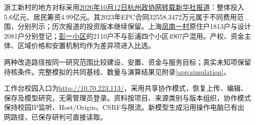 \documentclass[UTF8,11pt,fontset=windows]{ctexart}
\begin{document}
浙工新村的地方对标采用\href{https://www.hzzx.gov.cn/cshz/content/2026-10/12/content_9334536.htm}{2026年10月12日杭州政协网转载新华社报道}：整体投入5.6亿元、居民筹资4.99亿元。其2023年EPC合同32558.3472万元属于不同费用范围，分别列示；历次报道的投资版本继续保留。上海\href{https://www.shanghai.gov.cn/nw4411/20240628/e6c15eb4d57b4bbf949489c86701911d.html}{凤南一村}原住户1813户与设计2081户分别登记；\href{https://www.shanghai.gov.cn/nw15343/20250708/5a71cffe715b40a097176469b7066c35.html}{彭一小区}的2110户不与彭浦四个小区4907户混用。产权、资金主体、区域价格和安置机制均作为差异项进入比选。

两种改造路径按同一研究范围比较建设、安置、资金与服务目标；真实未知项保留待核条件。完整模拟的共同基线、数量与演算结果见附录\ref{app:simulation}。

工作台校园入口为\url{http://10.70.223.113/}，采用共享协作模式，恢复上传、编辑、保存及模型研究，无需管理员登录。资料按项目、来源类别与版本组织，协作模式保持校园IP监听、Host/Origin、CSRF与限流。新模型生成沿用操作电脑已有出网路径，已保存研判可直接读取。

\clearpage
\appendix

\clearpage

\clearpage

\end{document}

